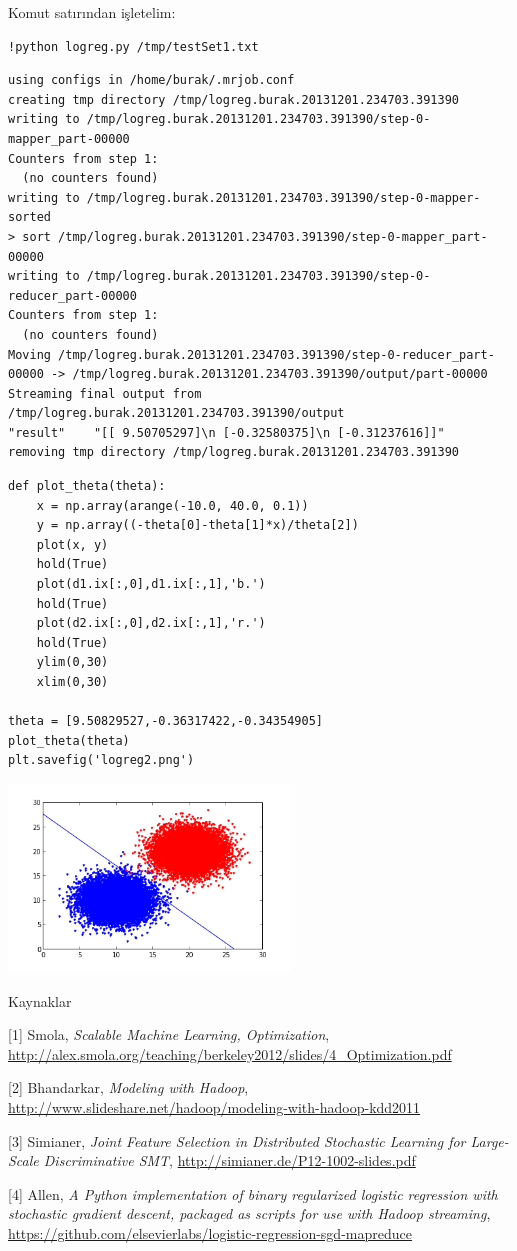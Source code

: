 \documentclass[12pt,fleqn]{article}\usepackage{../../common}
\begin{document}
Komut satırından işletelim:

\begin{verbatim}
!python logreg.py /tmp/testSet1.txt 
\end{verbatim}

\begin{verbatim}
using configs in /home/burak/.mrjob.conf
creating tmp directory /tmp/logreg.burak.20131201.234703.391390
writing to /tmp/logreg.burak.20131201.234703.391390/step-0-mapper_part-00000
Counters from step 1:
  (no counters found)
writing to /tmp/logreg.burak.20131201.234703.391390/step-0-mapper-sorted
> sort /tmp/logreg.burak.20131201.234703.391390/step-0-mapper_part-00000
writing to /tmp/logreg.burak.20131201.234703.391390/step-0-reducer_part-00000
Counters from step 1:
  (no counters found)
Moving /tmp/logreg.burak.20131201.234703.391390/step-0-reducer_part-00000 -> /tmp/logreg.burak.20131201.234703.391390/output/part-00000
Streaming final output from /tmp/logreg.burak.20131201.234703.391390/output
"result"	"[[ 9.50705297]\n [-0.32580375]\n [-0.31237616]]"
removing tmp directory /tmp/logreg.burak.20131201.234703.391390
\end{verbatim}

\begin{verbatim}
def plot_theta(theta):
    x = np.array(arange(-10.0, 40.0, 0.1))
    y = np.array((-theta[0]-theta[1]*x)/theta[2])
    plot(x, y)
    hold(True)
    plot(d1.ix[:,0],d1.ix[:,1],'b.')
    hold(True)
    plot(d2.ix[:,0],d2.ix[:,1],'r.')
    hold(True)
    ylim(0,30)
    xlim(0,30)

theta = [9.50829527,-0.36317422,-0.34354905]
plot_theta(theta)
plt.savefig('logreg2.png')
\end{verbatim}

\includegraphics[height=5cm]{logreg2.png}

Kaynaklar

[1] Smola, {\em Scalable Machine Learning, Optimization}, \url{http://alex.smola.org/teaching/berkeley2012/slides/4_Optimization.pdf}

[2] Bhandarkar, {\em Modeling with Hadoop}, \url{http://www.slideshare.net/hadoop/modeling-with-hadoop-kdd2011}

[3] Simianer, {\em Joint Feature Selection in Distributed Stochastic Learning for Large-Scale Discriminative SMT}, \url{http://simianer.de/P12-1002-slides.pdf}

[4] Allen, {\em A Python implementation of binary regularized logistic
  regression with stochastic gradient descent, packaged as scripts for use
  with Hadoop streaming}, \url{https://github.com/elsevierlabs/logistic-regression-sgd-mapreduce}
\end{document}
